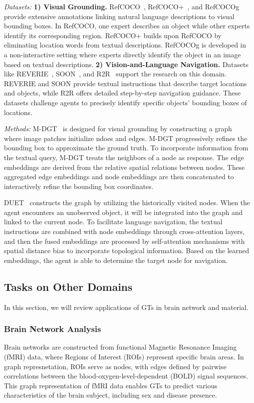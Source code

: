 \textit{Datasets: }
\textbf{1) Visual Grounding.} RefCOCO~\cite{yu2016modeling}, RefCOCO+~\cite{yu2016modeling}, and RefCOCOg~\cite{mao2016generation} provide extensive annotations %
linking natural language descriptions to visual bounding boxes.
In RefCOCO, one expert describes an object while other experts identify its corresponding region.  
RefCOCO+ builds upon RefCOCO by eliminating location words from  textual descriptions. RefCOCOg is developed in a non-interactive setting where experts directly identify the object in an image based on textual descriptions.
\textbf{2) Vision-and-Language Navigation.} Datasets like REVERIE~\cite{qi2020reverie}, SOON~\cite{zhu2021soon}, and R2R~\cite{anderson2018vision} support the research on this domain. REVERIE and SOON provide textual instructions that describe target locations and objects, while R2R offers detailed step-by-step navigation  guidance. 
These datasets challenge agents to precisely identify specific objects' bounding boxes of locations.

\textit{Methods: }
M-DGT~\cite{chen2022multi} is designed for visual grounding by constructing a graph where image patches initialize ndoes and edges. 
M-DGT progressively refines the bounding box to approximate the ground truth. To incorporate information from the textual query, M-DGT treats the neighbors of a node as response. The edge embeddings are derived from the relative spatial relations between nodes. These aggregated edge embeddings and node embeddings are then concatenated to interactively refine the bounding box coordinates.

DUET~\cite{chen2022think} constructs the graph by utilizing the historically visited nodes. When the agent encounters an unobserved object, it will be integrated into the graph and linked to the current node. To facilitate language navigation, the textual instructions are combined with node embeddings through cross-attention layers, and then the fused embeddings are processed by self-attention mechanisms with spatial distance bias to incorporate topological information. Based on the learned embeddings, the agent is able to determine the target node for navigation.


\subsection{Tasks on Other Domains}
\label{sec:application-other}
In this section, we will review applications of GTs in brain network and material.

\subsubsection{\textbf{Brain Network Analysis}}
Brain networks are constructed from functional Magnetic Resonance Imaging (fMRI) data, where Regions of Interest (ROIs) represent specific brain areas. 
In graph represnetation, ROIs serve as nodes, with edges defined by pairwise correlations between the blood-oxygen-level-dependent (BOLD) signal sequences. 
This graph representation of fMRI data enables GTs to predict various characteristics of the brain subject, including sex and disease presence.

